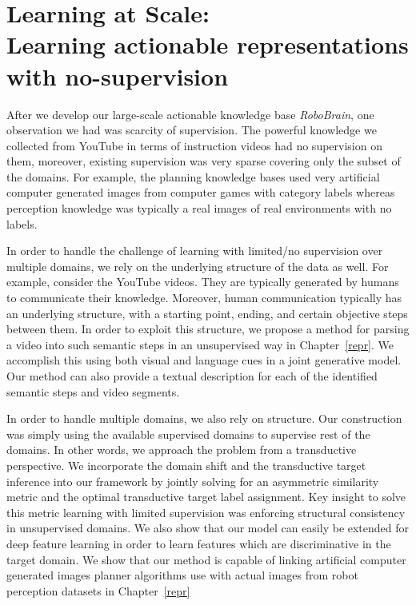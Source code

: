 \section{Learning at Scale: \\ Learning actionable representations with no-supervision}
After we develop our large-scale actionable knowledge base \emph{RoboBrain}, one observation we had was scarcity of supervision. The powerful knowledge we collected from YouTube in terms of instruction videos had no supervision on them, moreover, existing supervision was very sparse covering only the subset of the domains. For example, the planning knowledge bases used very artificial computer generated images from computer games with category labels whereas perception knowledge was typically a real images of real environments with no labels.

In order to handle the challenge of learning with limited/no supervision over multiple domains, we rely on the underlying structure of the data as well. For example, consider the YouTube videos. They are typically generated by humans to communicate their knowledge. Moreover, human communication typically has an underlying structure, with a starting point, ending, and certain objective steps between them. In order to exploit this structure, we propose a method for parsing a video into such semantic steps in an unsupervised way in Chapter~\ref{repr}. We accomplish this using both visual and language cues in a joint generative model. Our method can also provide a textual description for each of the identified semantic steps and video segments. 

In order to handle multiple domains, we also rely on structure. Our construction was simply using the available supervised domains to supervise rest of the domains. In other words, we approach the problem from a transductive perspective. We incorporate the domain shift and the transductive target inference into our framework by jointly solving for an asymmetric similarity metric and the optimal transductive target label assignment. Key insight to solve this metric learning with limited supervision was enforcing structural consistency in unsupervised domains. We also show that our model can easily be extended for deep feature learning in order to learn features which are discriminative in the target domain. We show that our method is capable of linking artificial computer generated images planner algorithms use with actual images from robot perception datasets in Chapter~\ref{repr}


